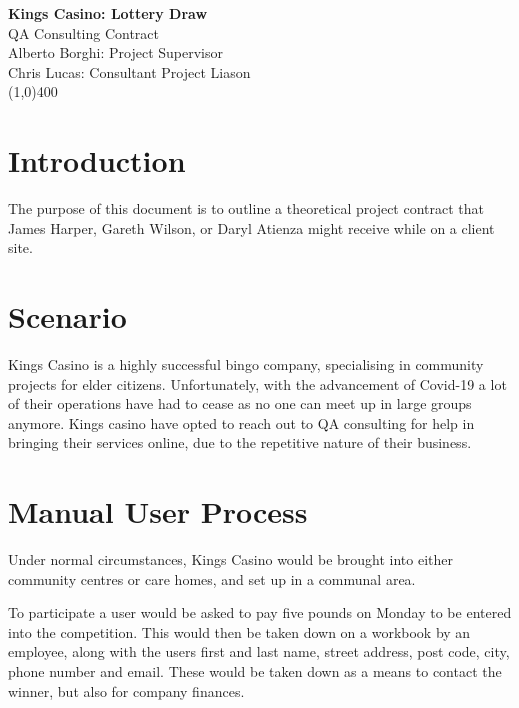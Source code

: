 \documentclass[12]{article}
\begin{document}
\begin{titlepage}
\begin{center}
	
	\LARGE{\bf{Kings Casino: Lottery Draw}}\\
	[1cm]
	\large{QA Consulting Contract \\ Alberto Borghi: Project Supervisor}\\
	\large{Chris Lucas: Consultant Project Liason } \\
	[0.2cm]
	\line(1,0){400} \\
	
\end{center}


\end{titlepage}

\cleardoublepage

\section{Introduction} \label{sec:intro}

The purpose of this document is to outline a theoretical project contract that James Harper, Gareth Wilson, or Daryl Atienza might receive while on a client site.

\section{Scenario} \label{sec:intro}

Kings Casino is a highly successful bingo company, specialising in community projects for elder citizens. Unfortunately, with the advancement of Covid-19 a lot of their operations have had to cease as no one can meet up in large groups anymore. Kings casino have opted to reach out to QA consulting for help in bringing their services online, due to the repetitive nature of their business.

\section{Manual User Process}

Under normal circumstances, Kings Casino would be brought into either community centres or care homes, and set up in a communal area.
 
To participate a user would be asked to pay five pounds on Monday to be entered into the competition. This would then be taken down on a workbook by an employee, along with the users first and last name, street address, post code, city, phone number and email. These would be taken down as a means to contact the winner, but also for company finances.
\end{document}

